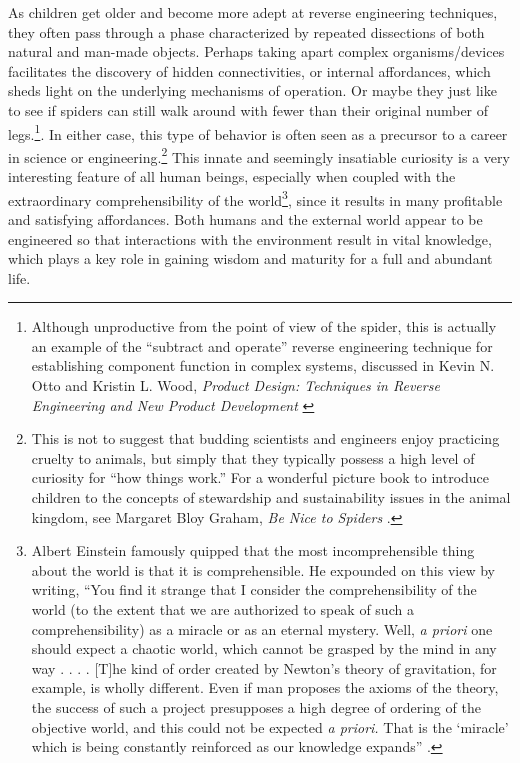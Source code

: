 As children get older and become more adept at reverse engineering
techniques, they often pass through a phase characterized by repeated
dissections of both natural and man-made objects. Perhaps taking apart
complex organisms/devices facilitates the discovery of hidden
connectivities, or internal affordances, which sheds light on the
underlying mechanisms of operation. Or maybe they just like to see if
spiders can still walk around with fewer than their original number of
legs.\footnote{Although unproductive from the point of view of the
spider, this is actually an example of the “subtract and operate”
reverse engineering technique for establishing component function in
complex systems, discussed in Kevin N. Otto and Kristin L. Wood,
\textit{Product Design: Techniques in Reverse Engineering and New Product Development} \citep[][pp. 159--162, 204--211]{ottowood2001}}.
In either case, this type of behavior is often
seen as a precursor to a career in science or
engineering.\footnote{
This is not to suggest that budding scientists and
engineers enjoy practicing cruelty to animals, but simply that they
typically possess a high level of curiosity for “how things work.” For
a wonderful picture book to introduce children to the concepts of
stewardship and sustainability issues in the animal kingdom, see
Margaret Bloy Graham, \textit{Be Nice to Spiders} \citep{graham1967}.
}
This innate and seemingly insatiable
curiosity is a very interesting feature of all human beings, especially
when coupled with the extraordinary comprehensibility of the
world\footnote{
Albert Einstein famously quipped that the most
incomprehensible thing about the world is that it is comprehensible. He
expounded on this view by writing, ``You find it strange that I consider
the comprehensibility of the world (to the extent that we are
authorized to speak of such a comprehensibility) as a miracle or as an
eternal mystery. Well, \textit{a priori} one should expect a chaotic
world, which cannot be grasped by the mind in any way . . . . [T]he
kind of order created by Newton's theory of
gravitation, for example, is wholly different. Even if man proposes the
axioms of the theory, the success of such a project presupposes a high
degree of ordering of the objective world, and this could not be
expected \textit{a priori.} That is the
`miracle' which is being constantly
reinforced as our knowledge expands'' \citep[][p.~131]{einstein1987}.
}, since it results in many profitable and
satisfying affordances. Both humans and the external world appear to be
engineered so that interactions with the environment result in vital
knowledge, which plays a key role in gaining wisdom and maturity for a
full and abundant life.  %


